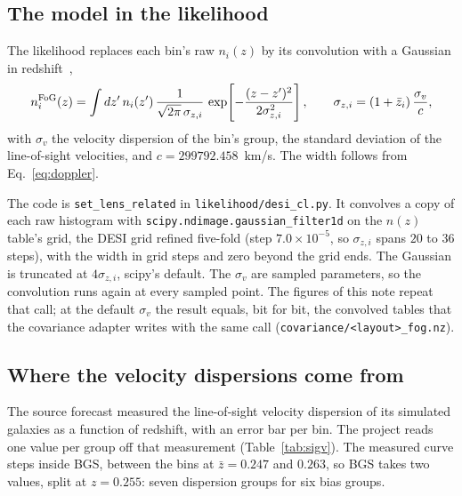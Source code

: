 \documentclass[11pt]{article}
\newcommand{\sv}{\sigma_v}
\newcommand{\us}{\_\allowbreak}
\begin{document}
\subsection{The model in the likelihood}

The likelihood replaces each bin's raw $n_i(z)$ by its convolution with
a Gaussian in redshift~\cite{GrasshornGebhardt2020},
\begin{equation}
  n_i^{\rm FoG}(z) = \int dz'\, n_i(z')\,
  \frac{1}{\sqrt{2\pi}\,\sigma_{z,i}}\,
  \exp\!\left[-\frac{(z - z')^2}{2\sigma_{z,i}^2}\right] ,
  \qquad
  \sigma_{z,i} = (1 + \bar{z}_i)\,\frac{\sv}{c} ,
  \label{eq:fog}
\end{equation}
with $\sv$ the velocity dispersion of the bin's group, the standard
deviation of the line-of-sight velocities, and $c = 299792.458$~km/s.
The width follows from Eq.~\eqref{eq:doppler}.

The code is \texttt{set\us lens\us related} in
\texttt{likelihood/desi\us cl.py}.  It convolves a copy of each raw
histogram with \texttt{scipy.ndimage.gaussian\us filter1d} on the
$n(z)$ table's grid, the DESI grid refined five-fold (step
$7.0 \times 10^{-5}$, so $\sigma_{z,i}$ spans $20$ to $36$ steps), with
the width in grid steps and zero beyond the grid ends.  The Gaussian is
truncated at $4\sigma_{z,i}$, scipy's default.  The $\sv$ are sampled
parameters, so the convolution runs again at every sampled point.  The
figures of this note repeat that call; at the default $\sv$ the result
equals, bit for bit, the convolved tables that the covariance adapter
writes with the same call (\texttt{covariance/<layout>\us fog.nz}).

\subsection{Where the velocity dispersions come from}

The source forecast measured the line-of-sight velocity dispersion of
its simulated galaxies as a function of redshift, with an error bar per
bin.  The project reads one value per group off that measurement
(Table~\ref{tab:sigv}).  The measured curve steps inside BGS, between
the bins at $\bar{z} = 0.247$ and $0.263$, so BGS takes two values,
split at $z = 0.255$: seven dispersion groups for six bias groups.
\end{document}

